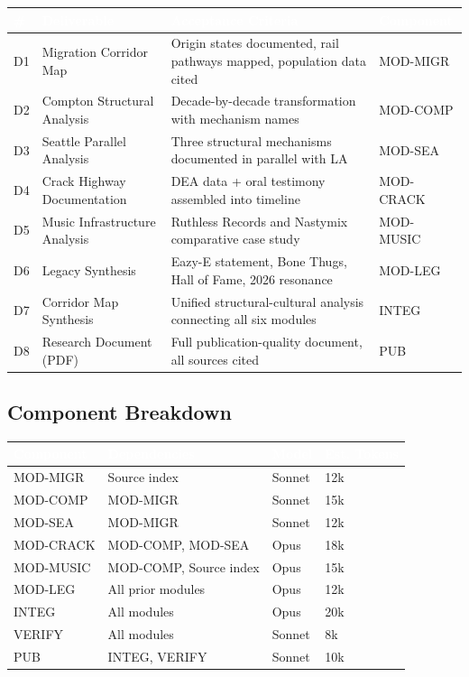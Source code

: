 \documentclass[11pt,letterpaper]{article}
\newcommand{\tableheader}[1]{\textbf{\sffamily\textcolor{white}{#1}}}
\begin{document}
\begin{center}
\begin{tabularx}{\textwidth}{C{0.8cm}L{3.5cm}XL{2.5cm}}
\toprule
{}
\tableheader{\#} & \tableheader{Deliverable} & \tableheader{Acceptance Criteria} & \tableheader{Component} \\
\midrule
D1 & Migration Corridor Map & Origin states documented, rail pathways mapped, population data cited & MOD-MIGR \\
D2 & Compton Structural Analysis & Decade-by-decade transformation with mechanism names & MOD-COMP \\
D3 & Seattle Parallel Analysis & Three structural mechanisms documented in parallel with LA & MOD-SEA \\
D4 & Crack Highway Documentation & DEA data + oral testimony assembled into timeline & MOD-CRACK \\
D5 & Music Infrastructure Analysis & Ruthless Records and Nastymix comparative case study & MOD-MUSIC \\
D6 & Legacy Synthesis & Eazy-E statement, Bone Thugs, Hall of Fame, 2026 resonance & MOD-LEG \\
D7 & Corridor Map Synthesis & Unified structural-cultural analysis connecting all six modules & INTEG \\
D8 & Research Document (PDF) & Full publication-quality document, all sources cited & PUB \\
\bottomrule
\end{tabularx}
\end{center}

\subsection{Component Breakdown}

\begin{center}
\begin{tabularx}{\textwidth}{L{2.5cm}L{2.5cm}C{1.8cm}C{1.8cm}}
\toprule
{}
\tableheader{Component} & \tableheader{Dependencies} & \tableheader{Model} & \tableheader{Est. Tokens} \\
\midrule
MOD-MIGR & Source index & Sonnet & 12k \\
MOD-COMP & MOD-MIGR & Sonnet & 15k \\
MOD-SEA & MOD-MIGR & Sonnet & 12k \\
MOD-CRACK & MOD-COMP, MOD-SEA & Opus & 18k \\
MOD-MUSIC & MOD-COMP, Source index & Opus & 15k \\
MOD-LEG & All prior modules & Opus & 12k \\
INTEG & All modules & Opus & 20k \\
VERIFY & All modules & Sonnet & 8k \\
PUB & INTEG, VERIFY & Sonnet & 10k \\
\bottomrule
\end{tabularx}
\end{center}
\end{document}
